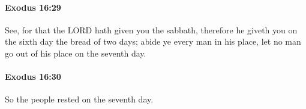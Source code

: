 		\paragraph{Exodus 16:29} %
			\label{EXODUS-16-29}

			See, for that the LORD hath given you the sabbath, therefore he giveth you on the sixth day the bread of two days; abide ye every man in his place, let no man go out of his place on the seventh day.


		\paragraph{Exodus 16:30} %
			\label{EXODUS-16-30}

			So the people rested on the seventh day.


